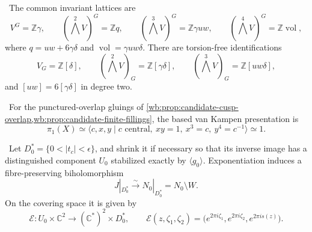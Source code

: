 
\begin{theorem}\label{wb:thm:coinvariants}
\ The common invariant lattices are
\[
 V^G=\mathbb Z\gamma,\qquad
 (\textstyle\bigwedge^2V)^G=\mathbb Zq,\qquad
 (\textstyle\bigwedge^3V)^G=\mathbb Z\gamma uw,\qquad
 (\textstyle\bigwedge^4V)^G=\mathbb Z\operatorname{vol},
\]
where $q=uw+6\gamma\delta$ and
$\operatorname{vol}=\gamma uw\delta$.  There are torsion-free
identifications
\[
V_G=\mathbb Z[\delta],\qquad
(\textstyle\bigwedge^2V)_G=\mathbb Z[\gamma\delta],
\qquad
(\textstyle\bigwedge^3V)_G=\mathbb Z[uw\delta],
\tag{3.5}
\]
and $[uw]=6[\gamma\delta]$ in degree two.
\end{theorem}

\begin{proposition}
\label{mapsI:top:prop:geometric-pi1}
\ For the punctured-overlap gluings of
\cref{wb:prop:candidate-cusp-overlap,wb:prop:candidate-finite-fillings}, the based
van Kampen presentation is
\[
 \pi_1(X)\simeq
 \langle c,x,y\mid c\text{ central},\ xy=1,\ x^3=c,\ y^4=c^{-1}\rangle
 \simeq1.
\tag{IL.5.24}
\]
\end{proposition}

\begin{proposition}
\label{wb:prop:candidate-cusp-overlap}
\ Let \(D_0^*=\{0<|t_c|<\epsilon\}\), and shrink it if necessary
so that its inverse image has a distinguished component \(U_0\) stabilized
exactly by \(\langle g_0\rangle\).  Exponentiation induces a
fibre-preserving biholomorphism
\[
 J|_{D_0^*}\xrightarrow{\ \sim\ }
 N_0|_{D_0^*}=N_0\setminus W.
\tag{2.8i}
\]
On the covering space it is given by
\[
 \mathcal E:U_0\times\mathbb C^2\longrightarrow
             (\mathbb C^*)^2\times D_0^*,
 \qquad
 \mathcal E(z,\zeta_1,\zeta_2)
 =\bigl(e^{2\pi i\zeta_1},e^{2\pi i\zeta_2},e^{2\pi is(z)}\bigr).
\tag{2.8ii}
\]
\end{proposition}


